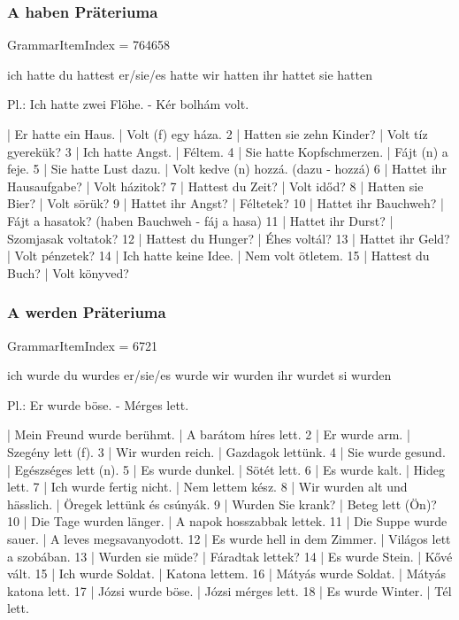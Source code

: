 \documentclass{article}
\newenvironment{desc}{\verbatim}{\endverbatim}
\newenvironment{exmp}{\verbatim}{\endverbatim}
\begin{document}
\subsubsection{A haben Präteriuma}

GrammarItemIndex = 764658

\begin{desc}
ich hatte
du hattest
er/sie/es hatte
wir hatten
ihr hattet
sie hatten

Pl.: Ich hatte zwei Flöhe. - Kér bolhám volt.
\end{desc}

\begin{exmp}
1 | Er hatte ein Haus. | Volt (f) egy háza.
2 | Hatten sie zehn Kinder? | Volt tíz gyerekük?
3 | Ich hatte Angst. | Féltem.
4 | Sie hatte Kopfschmerzen. | Fájt (n) a feje.
5 | Sie hatte Lust dazu. | Volt kedve (n) hozzá. (dazu - hozzá)
6 | Hattet ihr Hausaufgabe? | Volt házitok?
7 | Hattest du Zeit? | Volt időd?
8 | Hatten sie Bier? | Volt sörük?
9 | Hattet ihr Angst? | Féltetek?
10 | Hattet ihr Bauchweh? | Fájt a hasatok? (haben Bauchweh - fáj a hasa)
11 | Hattet ihr Durst? | Szomjasak voltatok?
12 | Hattest du Hunger? | Éhes voltál?
13 | Hattet ihr Geld? | Volt pénzetek?
14 | Ich hatte keine Idee. | Nem volt ötletem.
15 | Hattest du Buch? | Volt könyved?
\end{exmp}

\subsubsection{A werden Präteriuma}

GrammarItemIndex = 6721

\begin{desc}
ich wurde
du wurdes
er/sie/es wurde
wir wurden
ihr wurdet
si wurden

Pl.: Er wurde böse. - Mérges lett.
\end{desc}

\begin{exmp}
1 | Mein Freund wurde berühmt. | A barátom híres lett.
2 | Er wurde arm. | Szegény lett (f).
3 | Wir wurden reich. | Gazdagok lettünk.
4 | Sie wurde gesund. | Egészséges lett (n).
5 | Es wurde dunkel. | Sötét lett.
6 | Es wurde kalt. | Hideg lett.
7 | Ich wurde fertig nicht. | Nem lettem kész.
8 | Wir wurden alt und hässlich. | Öregek lettünk és csúnyák.
9 | Wurden Sie krank? | Beteg lett (Ön)?
10 | Die Tage wurden länger. | A napok hosszabbak lettek.
11 | Die Suppe wurde sauer. | A leves megsavanyodott.
12 | Es wurde hell in dem Zimmer. | Világos lett a szobában.
13 | Wurden sie müde? | Fáradtak lettek?
14 | Es wurde Stein. | Kővé vált.
15 | Ich wurde Soldat. | Katona lettem.
16 | Mátyás wurde Soldat. | Mátyás katona lett.
17 | Józsi wurde böse. | Józsi mérges lett.
18 | Es wurde Winter. | Tél lett.
\end{exmp}
\end{document}
